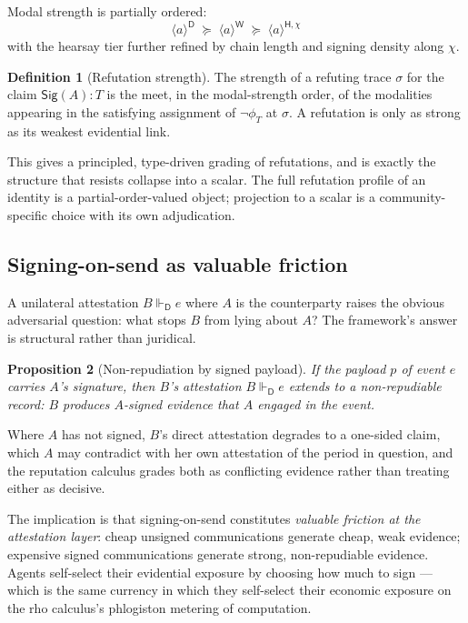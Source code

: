 \documentclass[11pt]{article}
\theoremstyle{definition}
\newtheorem{definition}{Definition}[section]
\theoremstyle{plain}
\newtheorem{proposition}[definition]{Proposition}
\theoremstyle{remark}
\newcommand{\Sig}{\mathsf{Sig}}
\newcommand{\Att}{\mathrel{\Vdash}}
\newcommand{\AttD}{\Att_{\!\mathsf{D}}}
\newcommand{\modD}[1]{\langle #1 \rangle^{\mathsf{D}}}
\newcommand{\modW}[1]{\langle #1 \rangle^{\mathsf{W}}}
\begin{document}
Modal strength is partially ordered:
\[
\modD{a} \;\succeq\; \modW{a} \;\succeq\; \langle a \rangle^{\mathsf{H},\chi}
\]
with the hearsay tier further refined by chain length and signing density along $\chi$.

\begin{definition}[Refutation strength]
The strength of a refuting trace $\sigma$ for the claim $\Sig(A):T$ is the meet, in the modal-strength order, of the modalities appearing in the satisfying assignment of $\neg \phi_T$ at $\sigma$. A refutation is only as strong as its weakest evidential link.
\end{definition}

This gives a principled, type-driven grading of refutations, and is exactly the structure that resists collapse into a scalar. The full refutation profile of an identity is a partial-order-valued object; projection to a scalar is a community-specific choice with its own adjudication.

\subsection{Signing-on-send as valuable friction}\label{ssec:friction}

A unilateral attestation $B \AttD e$ where $A$ is the counterparty raises the obvious adversarial question: what stops $B$ from lying about $A$? The framework's answer is structural rather than juridical.

\begin{proposition}[Non-repudiation by signed payload]
If the payload $p$ of event $e$ carries $A$'s signature, then $B$'s attestation $B \AttD e$ extends to a non-repudiable record: $B$ produces $A$-signed evidence that $A$ engaged in the event.
\end{proposition}

Where $A$ has not signed, $B$'s direct attestation degrades to a one-sided claim, which $A$ may contradict with her own attestation of the period in question, and the reputation calculus grades both as conflicting evidence rather than treating either as decisive.

The implication is that signing-on-send constitutes \emph{valuable friction at the attestation layer}: cheap unsigned communications generate cheap, weak evidence; expensive signed communications generate strong, non-repudiable evidence. Agents self-select their evidential exposure by choosing how much to sign --- which is the same currency in which they self-select their economic exposure on the rho calculus's phlogiston metering of computation.
\end{document}

